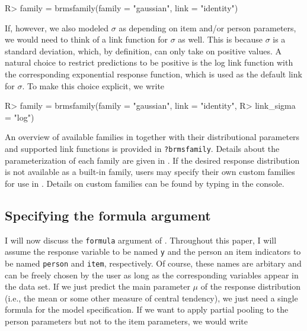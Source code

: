 \documentclass[jss]{jss}
\begin{document}
\begin{CodeChunk}

\begin{CodeInput}
R> family = brmsfamily(family = "gaussian", link = "identity")
\end{CodeInput}
\end{CodeChunk}

If, however, we also modeled \(\sigma\) as depending on item and/or
person parameters, we would need to think of a link function for
\(\sigma\) as well. This is because \(\sigma\) is a standard deviation,
which, by definition, can only take on positive values. A natural choice
to restrict predictions to be positive is the log link function with the
corresponding exponential response function, which is used as the
default link for \(\sigma\). To make this choice explicit, we write

\begin{CodeChunk}

\begin{CodeInput}
R> family = brmsfamily(family = "gaussian", link = "identity",
R>                     link_sigma = "log")
\end{CodeInput}
\end{CodeChunk}

An overview of available families in  together with their
distributional parameters and supported link functions is provided in
\texttt{?brmsfamily}. Details about the parameterization of each family
are given in . If the desired response
distribution is not available as a built-in family, users may specify
their own custom families for use in . Details on custom
families can be found by typing 
in the console.

\hypertarget{formula-prior}{%
\subsection{Specifying the formula argument}\label{formula-prior}}

I will now discuss the \texttt{formula} argument of .
Throughout this paper, I will assume the response variable to be named
\texttt{y} and the person an item indicators to be named \texttt{person}
and \texttt{item}, respectively. Of course, these names are arbitary and
can be freely chosen by the user as long as the corresponding variables
appear in the data set. If we just predict the main parameter \(\mu\) of
the response distribution (i.e., the mean or some other measure of
central tendency), we just need a single  formula for the
model specification. If we want to apply partial pooling to the person
parameters but not to the item parameters, we would write
\end{document}
